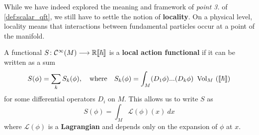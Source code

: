 While we have indeed explored the meaning and framework of \emph{point 3.} of \ref{def:scalar_qft}, we still have to settle the notion of \textbf{locality}. On a physical level, locality means that interactions between fundamental particles occur at a point of the manifold.

\begin{definition}
  A functional $S\colon \mathcal{C}^{\infty}(M) \longrightarrow \mathbb{R} \llbracket \hbar \rrbracket$ is a \textbf{local action functional} if it can be written as a sum
  $$ S(\phi) = \sum_k S_k (\phi), \quad \text{where} \quad S_k(\phi) = \int_M (D_1 \phi) ... (D_k \phi) \ \vol_M \ ( \llbracket \hbar \rrbracket)$$
  for some differential operators $D_i$ on $M$. This allows us to write $S$ as
  $$ S(\phi) = \int_M \mathcal{L}(\phi)(x) \ dx $$
  where $\mathcal{L}(\phi)$ is a \textbf{Lagrangian} and depends only on the expansion of $\phi$ at $x$.
\end{definition}




\newpage

